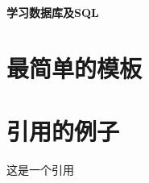 \documentclass[a4paper,12pt]{ctexart}
\begin{document}
\begin{center}
\huge \textbf{学习数据库及SQL}
\end{center}



\section{最简单的模板}


\section{引用的例子}
这是一个引用~\cite{LCN2002}


%


%
%

%
\end{document}
